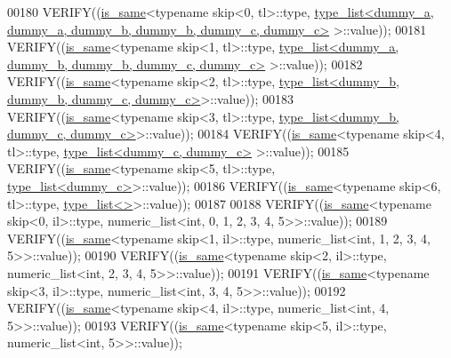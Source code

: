 \begin{DoxyCode}
00180   VERIFY((\hyperlink{struct_eigen_1_1internal_1_1is__same}{is\_same}<\textcolor{keyword}{typename} skip<0, tl>::type, 
      \hyperlink{struct_eigen_1_1internal_1_1type__list}{type\_list<dummy\_a, dummy\_a, dummy\_b, dummy\_b, dummy\_c, dummy\_c>}
      >::value));
00181   VERIFY((\hyperlink{struct_eigen_1_1internal_1_1is__same}{is\_same}<\textcolor{keyword}{typename} skip<1, tl>::type, 
      \hyperlink{struct_eigen_1_1internal_1_1type__list}{type\_list<dummy\_a, dummy\_b, dummy\_b, dummy\_c, dummy\_c>}
      >::value));
00182   VERIFY((\hyperlink{struct_eigen_1_1internal_1_1is__same}{is\_same}<\textcolor{keyword}{typename} skip<2, tl>::type, 
      \hyperlink{struct_eigen_1_1internal_1_1type__list}{type\_list<dummy\_b, dummy\_b, dummy\_c, dummy\_c>}>::value));
00183   VERIFY((\hyperlink{struct_eigen_1_1internal_1_1is__same}{is\_same}<\textcolor{keyword}{typename} skip<3, tl>::type, 
      \hyperlink{struct_eigen_1_1internal_1_1type__list}{type\_list<dummy\_b, dummy\_c, dummy\_c>}>::value));
00184   VERIFY((\hyperlink{struct_eigen_1_1internal_1_1is__same}{is\_same}<\textcolor{keyword}{typename} skip<4, tl>::type, \hyperlink{struct_eigen_1_1internal_1_1type__list}{type\_list<dummy\_c, dummy\_c>}
      >::value));
00185   VERIFY((\hyperlink{struct_eigen_1_1internal_1_1is__same}{is\_same}<\textcolor{keyword}{typename} skip<5, tl>::type, \hyperlink{struct_eigen_1_1internal_1_1type__list}{type\_list<dummy\_c>}>::value));
00186   VERIFY((\hyperlink{struct_eigen_1_1internal_1_1is__same}{is\_same}<\textcolor{keyword}{typename} skip<6, tl>::type, \hyperlink{struct_eigen_1_1internal_1_1type__list}{type\_list<>}>::value));
00187 
00188   VERIFY((\hyperlink{struct_eigen_1_1internal_1_1is__same}{is\_same}<\textcolor{keyword}{typename} skip<0, il>::type, numeric\_list<int, 0, 1, 2, 3, 4, 5>>::value));
00189   VERIFY((\hyperlink{struct_eigen_1_1internal_1_1is__same}{is\_same}<\textcolor{keyword}{typename} skip<1, il>::type, numeric\_list<int, 1, 2, 3, 4, 5>>::value));
00190   VERIFY((\hyperlink{struct_eigen_1_1internal_1_1is__same}{is\_same}<\textcolor{keyword}{typename} skip<2, il>::type, numeric\_list<int, 2, 3, 4, 5>>::value));
00191   VERIFY((\hyperlink{struct_eigen_1_1internal_1_1is__same}{is\_same}<\textcolor{keyword}{typename} skip<3, il>::type, numeric\_list<int, 3, 4, 5>>::value));
00192   VERIFY((\hyperlink{struct_eigen_1_1internal_1_1is__same}{is\_same}<\textcolor{keyword}{typename} skip<4, il>::type, numeric\_list<int, 4, 5>>::value));
00193   VERIFY((\hyperlink{struct_eigen_1_1internal_1_1is__same}{is\_same}<\textcolor{keyword}{typename} skip<5, il>::type, numeric\_list<int, 5>>::value));

\end{DoxyCode}
